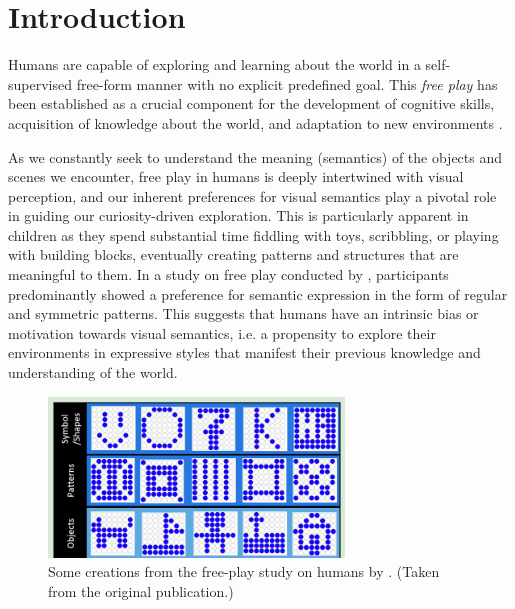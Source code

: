 \chapter{Introduction}
\label{sec:introduction}

Humans are capable of exploring and learning about the world in a self-supervised free-form manner with no explicit predefined goal.
This \emph{free play} has been established as a crucial component for the development of cognitive skills, acquisition of knowledge about the world, and adaptation to new environments \citep{exploration,chu2020play}.



As we constantly seek to understand the meaning (semantics) of the objects and scenes we encounter, free play in humans is deeply intertwined with visual perception, and our inherent preferences for visual semantics play a pivotal role in guiding our curiosity-driven exploration.
This is particularly apparent in children as they spend substantial time fiddling with toys, scribbling, or playing with building blocks, eventually creating patterns and structures that are meaningful to them.
In a study on free play conducted by \citet{diggs}, participants predominantly showed a preference for semantic expression in the form of regular and symmetric patterns.
This suggests that humans have an intrinsic bias or motivation towards visual semantics, i.e. a propensity to explore their environments in expressive styles that manifest their previous knowledge and understanding of the world.

\begin{figure}[h]
    \centering
    \includegraphics[width=0.7\textwidth]{images/diggs.png}
    \caption{Some creations from the free-play study on humans by \cite{diggs}. (Taken from the original publication.)}
    \label{fig:diggs}
\end{figure}

